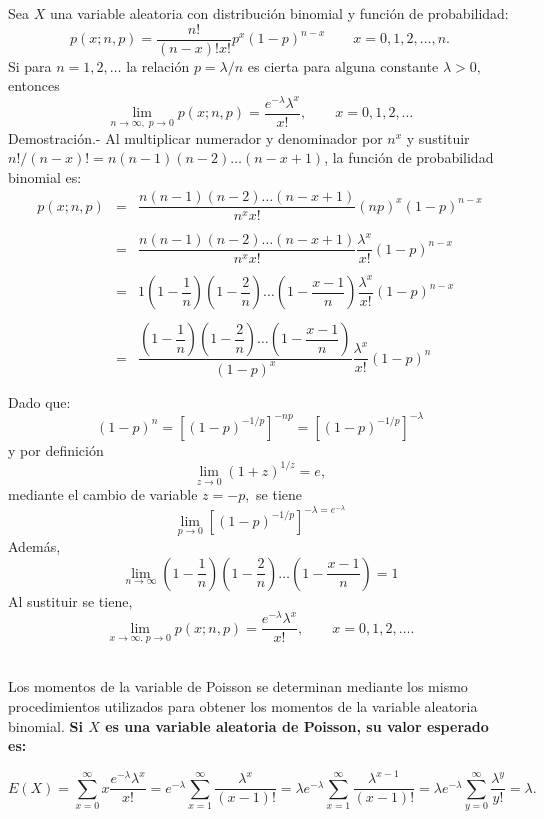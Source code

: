 \begin{teo}
    Sea $X$ una variable aleatoria con distribución binomial y función de probabilidad:
    $$p(x;n,p)=\dfrac{n!}{(n-x)!x!}p^x(1-p)^{n-x}\qquad x=0,1,2,\ldots,n.$$
    Si para $n=1,2,\ldots$ la relación $p=\lambda/n$ es cierta para alguna constante $\lambda>0,$ entonces
    $$\lim_{n\to\infty, \; p\to 0} p(x;n,p)=\dfrac{e^{-\lambda} \lambda^x}{x!},\qquad x=0,1,2,\ldots$$
    Demostración.-\; Al multiplicar numerador y denominador por $n^x$ y sustituir $n!/(n-x)!=n(n-1)(n-2)\ldots(n-x+1)$, la función de probabilidad binomial es:
    $$\begin{array}{rcl}
	p(x;n,p) &=& \dfrac{n(n-1)(n-2)\ldots(n-x+1)}{n^x x!}(np)^x(1-p)^{n-x}\\\\
		 &=& \dfrac{n(n-1)(n-2)\ldots(n-x+1)}{n^x x!}\dfrac{\lambda^x}{x!}(1-p)^{n-x}\\\\
		 &=& 1\left(1-\dfrac{1}{n}\right)\left(1-\dfrac{2}{n}\right)\ldots \left(1-\dfrac{x-1}{n}\right)\dfrac{\lambda^x}{x!}(1-p)^{n-x}\\\\
		 &=& \dfrac{\left(1-\dfrac{1}{n}\right)\left(1-\dfrac{2}{n}\right)\ldots \left(1-\dfrac{x-1}{n}\right)}{(1-p)^x}\dfrac{\lambda^x}{x!}(1-p)^{n}\\\\
    \end{array}$$
    Dado que:
    $$(1-p)^n=[(1-p)^{-1/p}]^{-np} = [(1-p)^{-1/p}]^{-\lambda}$$
    y por definición 
    $$\lim_{z\to 0}(1+z)^{1/z}=e,$$
    mediante el cambio de variable $z=-p,$ se tiene
    $$\lim_{p\to 0}[(1-p)^{-1/p}]^{-\lambda=e^{-\lambda}}$$
    Además,
    $$\lim_{n\to \infty}\left(1-\dfrac{1}{n}\right)\left(1-\dfrac{2}{n}\right)\ldots \left(1-\dfrac{x-1}{n}\right)=1$$
    Al sustituir se tiene,
    $$\lim_{x\to \infty.\; p\to 0}p(x;n,p)=\dfrac{e^{-\lambda}\lambda^{x}}{x!},\qquad x=0,1,2,\ldots .$$\\
\end{teo}

Los momentos de la variable de Poisson se determinan mediante los mismo procedimientos utilizados para obtener los momentos de la variable aleatoria binomial. \textbf{\boldmath Si $X$ es una variable aleatoria de Poisson, su valor esperado es:}

\begin{tcolorbox}
    $$E(X)=\sum_{x=0}^\infty x\dfrac{e^{-\lambda}\lambda^x}{x!}=e^{-\lambda}\sum_{x=1}^\infty\dfrac{\lambda^x}{(x-1)!}=\lambda e^{-\lambda}\sum_{x=1}^\infty \dfrac{\lambda^{x-1}}{(x-1)!}=\lambda e^{-\lambda}\sum_{y=0}^\infty \dfrac{\lambda^y}{y!}=\lambda.$$
\end{tcolorbox}

